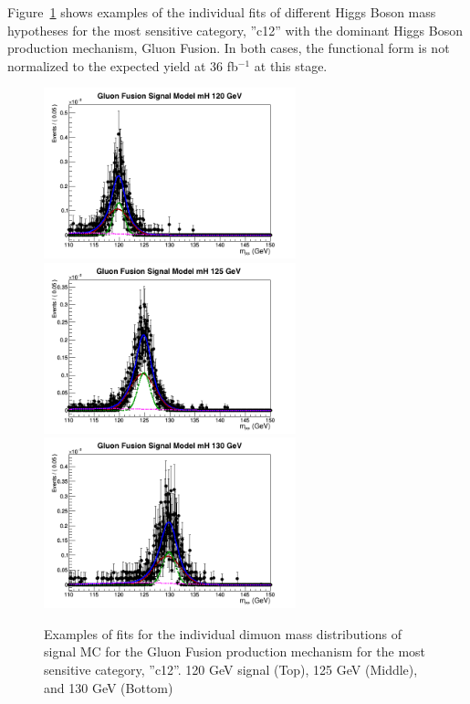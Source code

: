 Figure~\ref{fig:higgs_signalmodel_c12gluglu120125130} shows examples of the individual fits of different Higgs Boson mass hypotheses for the most sensitive category,  ''c12'' with the dominant Higgs Boson production mechanism, Gluon Fusion. In both cases, the functional form is not normalized to the expected yield at 36 fb$^{-1}$ at this stage.
 \begin{figure}[htbp]
     \centering
     \includegraphics[width=0.65\textwidth]{figures/signal_model/AppendixBdt/GluGlu/120/fit_mh_120_GluGlu_cat12.png}\\
     \includegraphics[width=0.65\textwidth]{figures/signal_model/AppendixBdt/GluGlu/125/fit_mh_125_GluGlu_cat12.png}\\
     \includegraphics[width=0.65\textwidth]{figures/signal_model/AppendixBdt/GluGlu/130/fit_mh_130_GluGlu_cat12.png}
     \caption{Examples of fits for the individual dimuon mass distributions of signal MC for the Gluon Fusion production mechanism for the most sensitive category, ''c12''. 120 GeV signal (Top), 125 GeV (Middle), and 130 GeV (Bottom)}
     \label{fig:higgs_signalmodel_c12gluglu120125130}
 \end{figure}

